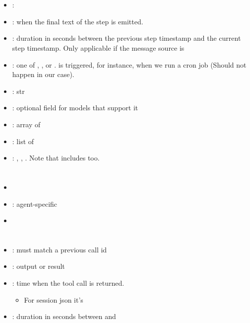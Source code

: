 \documentclass[11pt]{article}
\begin{document}
\section*{\texorpdfstring{}{steps}}


\begin{itemize}
\item {}: 
\item {}: when the final text of the step is emitted. 
\item {}: duration in seconds between the previous step timestamp and the current step timestamp. Only applicable if the message source is 
\item {}: one of , , or .  is triggered, for instance, when we run a cron job (Should not happen in our case).
\item {}:  str
\item {}: optional field for models that support it
\item {}: array of 
\item {}: list of 
\item {}: , , . Note that  includes  too.
\end{itemize}

\section*{\texorpdfstring{}{ToolCall Scheme}}
\begin{itemize}[leftmargin=2em]
    \item {}
    \item {}: agent-specific
    \item {}
\end{itemize}

\section*{\texorpdfstring{}{Observation Scheme}}
\begin{itemize}[leftmargin=2em]
    \item {}: must match a previous call id
    \item {}: output or result
    \item {}: time when the tool call is returned.
    \begin{itemize}
      \item For  session json it's 
    \end{itemize}
    \item {}: duration in seconds between  and 
\end{itemize}
\end{document}
